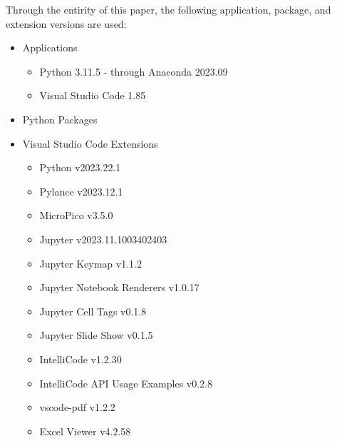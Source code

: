Through the entirity of this paper, the following application, package, and extension versions are used:

\begin{itemize}
    \item Applications
    \begin{itemize}
        \item Python 3.11.5 - through Anaconda 2023.09
        \item Visual Studio Code 1.85
    \end{itemize}
    \item Python Packages
    \item Visual Studio Code Extensions
    \begin{itemize}
        \item Python v2023.22.1
        \item Pylance v2023.12.1
        \item MicroPico v3.5.0
        \item Jupyter v2023.11.1003402403
        \item Jupyter Keymap v1.1.2
        \item Jupyter Notebook Renderers v1.0.17 
        \item Jupyter Cell Tags v0.1.8
        \item Jupyter Slide Show v0.1.5
        \item IntelliCode v1.2.30
        \item IntelliCode API Usage Examples v0.2.8
        \item vscode-pdf v1.2.2
        \item Excel Viewer v4.2.58
    \end{itemize}
\end{itemize}